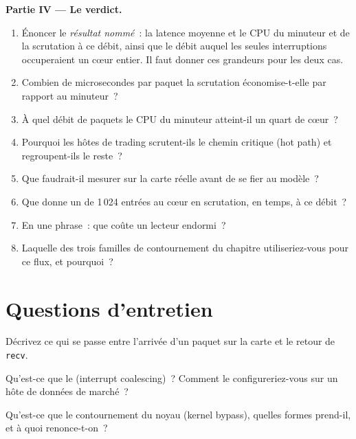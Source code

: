 \begin{problem}
\medskip\noindent\textbf{Partie IV --- Le verdict.}
\begin{enumerate}[resume]
\item Énoncer le \emph{résultat nommé}~: la latence moyenne et le CPU du minuteur et de la scrutation à ce débit, ainsi que le débit auquel les seules interruptions occuperaient un cœur entier.
  Il faut donner ces grandeurs pour les deux cas.
\item Combien de microsecondes par paquet la scrutation économise-t-elle par rapport au minuteur~?
\item À quel débit de paquets le CPU du minuteur atteint-il un quart de cœur~?
\item Pourquoi les hôtes de trading scrutent-ils le chemin critique (hot path) et regroupent-ils le reste~?
\item Que faudrait-il mesurer sur la carte réelle avant de se fier au modèle~?
\item Que donne un  de 1\,024 entrées au cœur en scrutation, en temps, à ce débit~?
\item En une phrase~: que coûte un lecteur endormi~?
\item Laquelle des trois familles de contournement du chapitre utiliseriez-vous pour ce flux, et pourquoi~?
\end{enumerate}
\end{problem}

\section{Questions d'entretien}

\begin{interviewq}\label{iq:nw:network-cards-and-kernel-bypass:1}
Décrivez ce qui se passe entre l'arrivée d'un paquet sur la carte et le retour de \texttt{recv}.
\end{interviewq}

\begin{interviewq}\label{iq:nw:network-cards-and-kernel-bypass:2}
Qu'est-ce que le  (interrupt coalescing)~? Comment le configureriez-vous sur un hôte de données de marché~?
\end{interviewq}

\begin{interviewq}\label{iq:nw:network-cards-and-kernel-bypass:3}
Qu'est-ce que le contournement du noyau (kernel bypass), quelles formes prend-il, et à quoi renonce-t-on~?
\end{interviewq}


